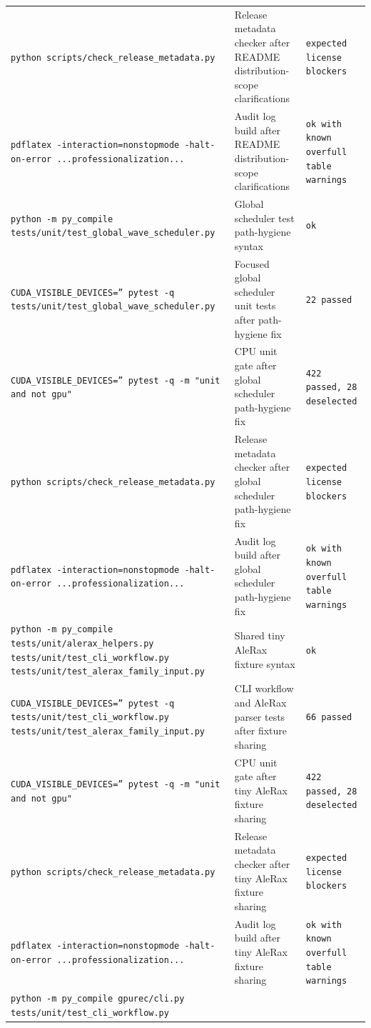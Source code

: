 \documentclass[11pt]{article}
\begin{document}
\begin{center}
\begin{tabular}{lll}
\texttt{python scripts/check\_release\_metadata.py} &
Release metadata checker after README distribution-scope clarifications &
\texttt{expected license blockers} \\
\texttt{pdflatex -interaction=nonstopmode -halt-on-error ...professionalization...} &
Audit log build after README distribution-scope clarifications &
\texttt{ok with known overfull table warnings} \\
\texttt{python -m py\_compile tests/unit/test\_global\_wave\_scheduler.py} &
Global scheduler test path-hygiene syntax &
\texttt{ok} \\
\texttt{CUDA\_VISIBLE\_DEVICES='' pytest -q tests/unit/test\_global\_wave\_scheduler.py} &
Focused global scheduler unit tests after path-hygiene fix &
\texttt{22 passed} \\
\texttt{CUDA\_VISIBLE\_DEVICES='' pytest -q -m "unit and not gpu"} &
CPU unit gate after global scheduler path-hygiene fix &
\texttt{422 passed, 28 deselected} \\
\texttt{python scripts/check\_release\_metadata.py} &
Release metadata checker after global scheduler path-hygiene fix &
\texttt{expected license blockers} \\
\texttt{pdflatex -interaction=nonstopmode -halt-on-error ...professionalization...} &
Audit log build after global scheduler path-hygiene fix &
\texttt{ok with known overfull table warnings} \\
\texttt{python -m py\_compile tests/unit/alerax\_helpers.py tests/unit/test\_cli\_workflow.py tests/unit/test\_alerax\_family\_input.py} &
Shared tiny AleRax fixture syntax &
\texttt{ok} \\
\texttt{CUDA\_VISIBLE\_DEVICES='' pytest -q tests/unit/test\_cli\_workflow.py tests/unit/test\_alerax\_family\_input.py} &
CLI workflow and AleRax parser tests after fixture sharing &
\texttt{66 passed} \\
\texttt{CUDA\_VISIBLE\_DEVICES='' pytest -q -m "unit and not gpu"} &
CPU unit gate after tiny AleRax fixture sharing &
\texttt{422 passed, 28 deselected} \\
\texttt{python scripts/check\_release\_metadata.py} &
Release metadata checker after tiny AleRax fixture sharing &
\texttt{expected license blockers} \\
\texttt{pdflatex -interaction=nonstopmode -halt-on-error ...professionalization...} &
Audit log build after tiny AleRax fixture sharing &
\texttt{ok with known overfull table warnings} \\
\texttt{python -m py\_compile gpurec/cli.py tests/unit/test\_cli\_workflow.py} &

\end{tabular}
\end{center}
\end{document}
